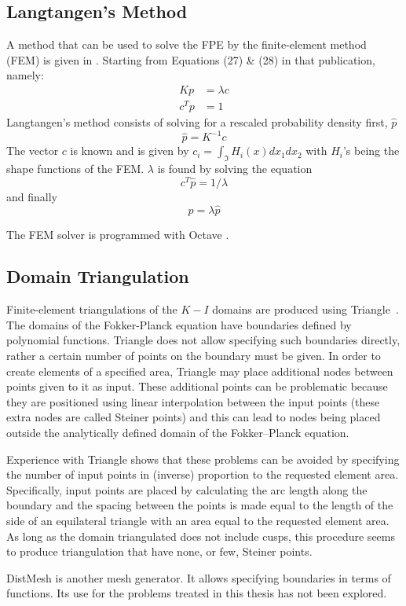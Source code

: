 \subsection{Langtangen's Method}

A method that can be used to solve the FPE by the finite-element method (FEM) is given in \citet{langtangen91:_fokker_planck}. Starting from Equations (27) \& (28) in that publication, namely:
\begin{align}
K p &= \lambda c\\
c^T p &= 1
\end{align}
Langtangen's method consists of solving for a rescaled probability density first, $\hat{p}$
\[
\hat{p} = K^{-1} c
\]
The vector $c$ is known and is given by $c_i = \int_{\mathfrak I} H_i(x) dx_1 dx_2$ with $H_i$'s being the shape functions of the FEM. $\lambda$ is found by solving the equation
\[
c^T \hat{p} = 1/\lambda
\]
and finally
\[
p = \lambda \hat{p}
\]

The FEM solver is programmed with Octave \citep{eaton02:_gnu_octav_manual}.

\subsection{Domain Triangulation}

Finite-element triangulations of the $K-I$ domains are produced using Triangle~\citep{shewchuk96:_trian}. The domains of the Fokker-Planck equation have boundaries defined by polynomial functions. Triangle does not allow specifying such boundaries directly, rather a certain number of points on the boundary must be given. In order to create elements of a specified area, Triangle may place additional nodes between points given to it as input. These additional points can be problematic because they are positioned using linear interpolation between the input points (these extra nodes are called Steiner points) and this can lead to nodes being placed outside the analytically defined domain of the Fokker--Planck equation.

Experience with Triangle shows that these problems can be avoided by specifying the number of input points in (inverse) proportion to the requested element area. Specifically, input points are placed by calculating the arc length along the boundary and the spacing between the points is made equal to the length of the side of an equilateral triangle with an area equal to the requested element area. As long as the domain triangulated does not include cusps, this procedure seems to produce triangulation that have none, or few, Steiner points.

DistMesh \citep{persson04:_simpl_mesh_gener_in_matlab} is another mesh generator. It allows specifying boundaries in terms of functions. Its use for the problems treated in this thesis has not been explored.

